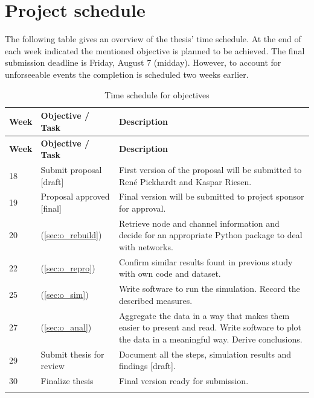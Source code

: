\documentclass[final]{fhnwreport}       %
\begin{document}
\section{Project schedule}
The following table gives an overview of the thesis' time schedule. At the end of each week indicated the mentioned objective is planned to be achieved. The final submission deadline is Friday, August 7 (midday). However, to account for unforseeable events the completion is scheduled two weeks earlier.

\renewcommand{\arraystretch}{1.5} %
\begin{longtable}[l]{l|p{4cm}|p{9cm}} %
\normalfont\textbf{Week} & \normalfont\textbf{Objective / Task} & \normalfont\textbf{Description} \\
\hline

\endfirsthead %
\normalfont\textbf{Week} & \normalfont\textbf{Objective / Task} & \normalfont\textbf{Description} \\
\hline
\endhead %

18 & Submit proposal [draft] & First version of the proposal will be submitted to René Pickhardt and Kaspar Riesen. \\
19 & Proposal approved [final] & Final version will be submitted to project sponsor for approval. \\
20 & \nameref{sec:o_rebuild} (\ref{sec:o_rebuild}) & Retrieve node and channel information and decide for an appropriate Python package to deal with networks.  \\
22 & \nameref{sec:o_repro} (\ref{sec:o_repro}) & Confirm similar results fount in previous study \cite{pickhardt_imbalance_2019} with own code and dataset. \\

25 & \nameref{sec:o_sim} (\ref{sec:o_sim}) & Write software to run the simulation. Record the described measures.  \\

27 & \nameref{sec:o_anal} (\ref{sec:o_anal}) & Aggregate the data in a way that makes them easier to present and read. Write software to plot the data in a meaningful way. Derive conclusions.  \\
29 & Submit thesis for review & Document all the steps, simulation results and findings [draft].  \\
30 & Finalize thesis & Final version ready for submission. \\

\caption{Time schedule for objectives}
\label{tab:Table1}

\end{longtable}
\end{document}
